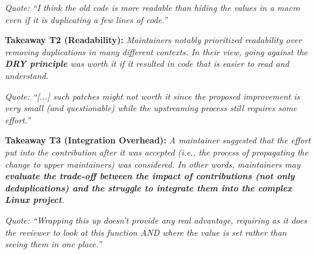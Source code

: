 \documentclass[10pt,conference]{IEEEtran}
\newenvironment{takeaway}[1]{%
  \begin{tcolorbox}
  \textbf{#1:} \itshape}{\end{tcolorbox}}
\begin{document}
\noindent
\begin{footnotesize}
  \textit{
    Quote: ``I think the old code is more readable than hiding the values in a macro
    even if it is duplicating a few lines of code.''
  }
\end{footnotesize}

\begin{takeaway}{Takeaway T2 (Readability)}
  Maintainers notably prioritized readability over removing duplications in
  many different contexts. In their view, going against the \textbf{DRY
  principle} was worth it if it resulted in code that is easier to read and
  understand.
\end{takeaway}

\noindent
\begin{footnotesize}
\textit{
    Quote: ``[...] such patches might not worth it since the proposed
    improvement is very small (and questionable) while the upstreaming process
    still requires some effort.''
  }
\end{footnotesize}

\begin{takeaway}{Takeaway T3 (Integration Overhead)}
  A maintainer suggested that the effort put into the contribution after it was
  accepted (i.e., the process of propagating the change to upper maintainers)
  was considered. In other words, maintainers may \textbf{evaluate the
  trade-off between the impact of contributions (not only deduplications) and
  the struggle to integrate them into the complex Linux project}.
\end{takeaway}

\noindent
\begin{footnotesize}
\textit{
    Quote: ``Wrapping this up doesn't provide any real advantage, requiring as
    it does the reviewer to look at this function AND where the value is set
    rather than seeing them in one place.''
  }
\end{footnotesize}
\end{document}
